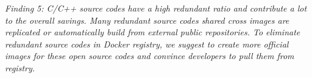 \textit{Finding 5: C/C++ source codes have a high redundant ratio and
contribute a lot to the overall savings. Many redundant source codes shared
cross images are replicated or automatically build from external public
repositories. To eliminate redundant source codes in Docker registry, we
suggest to create more official images for these open source codes and convince
developers to pull them from registry.}
%
%
%
%
%
%
